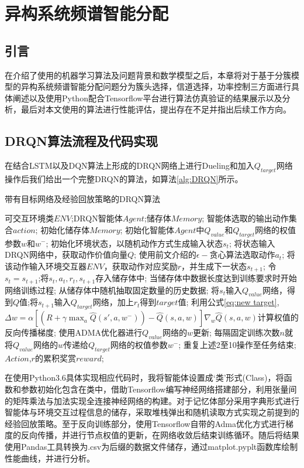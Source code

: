 \chapter{异构系统频谱智能分配}
\section{引言}
在介绍了使用的机器学习算法及问题背景和数学模型之后，本章将对于基于分簇模型的异构系统频谱智能分配问题分为簇头选择，信道选择，功率控制三方面进行具体阐述以及使用Python配合Tensorflow平台进行算法仿真验证的结果展示以及分析，最后对本文使用的算法进行性能评估，提出存在不足并指出后续工作方向。

\section{DRQN算法流程及代码实现}
在结合LSTM以及DQN算法上形成的DRQN网络上进行Dueling和加入$Q_{target}$网络操作后我们给出一个完整DRQN的算法，如算法\ref{alg:DRQN}所示。
\begin{algorithm}[htb]  
	\caption{带有目标网络及经验回放策略的DRQN算法 }  
	\label{alg:DRQN}  
	 \begin{algorithmic}[1]  
		\Require  
		可交互环境类$ENV$;DRQN智能体$Agent$;储存体$Memory$;  
		\Ensure  
		智能体选取的输出动作集合$action$;  
		\State 初始化储存体$Memory$; 初始化智能体$Agent$中$Q_{value}$和$Q_{target}$网络的权值参数$w$和$w^{-}$;
		初始化环境状态，以随机动作方式生成输入状态$s_{t}$; 
		\State 将状态输入DRQN网络中，获取动作价值向量$Q$;  
		\State 使用前文介绍的$\epsilon -$贪心算法选取动作$a_{t}$; 
		\State 将该动作输入环境交互器$ENV$，获取动作对应奖励$r$，并生成下一状态$s_{t+1}$;
		\State 令$s_{t}=s_{t+1}$;将$s_{t},a_{t},r_{t},s_{t+1}$存入储存体中; 
		\State 当储存体中数据长度达到训练要求时开始网络训练过程; 从储存体中随机抽取固定数量的历史数据;  
		\State 将$s_{t}$输入$Q_{value}$网络，得到$Q$值;将$s_{t+1}$输入$Q_{target}$网络，加上$r_{t}$得到$target$值;
		\State 利用公式\ref{eq:new target},$\Delta w=\alpha\left [ \left ( R+\gamma\max _{a} \hat{Q}\left ( {s}' ,a,w^{-}\right )\right )- 	\hat{Q}\left ( s ,a,w\right )\right ]\nabla_{w}\hat{Q}\left ( s,a,w \right )$计算权值的反向传播梯度;
		\State 使用ADMA优化器进行$Q_{value}$网络的$w$更新;
		\State 每隔固定训练次数$n$就将$Q_{value}$网络的$w$传递给$Q_{target}$网络的权值参数$w^{-}$;
		\State 重复上述2至10操作至任务结束; \\
		\Return $Action$,$r$的累积奖赏$reward$;  
	\end{algorithmic}  
\end{algorithm}  
在使用Python3.6具体实现相应代码时，我将智能体设置成‘类’形式(Class)，将函数和参数初始化包含在类中，借助Tensorflow编写神经网络搭建部分，利用张量间的矩阵乘法与加法实现全连接神经网络的构建。对于记忆体部分采用字典形式进行智能体与环境交互过程信息的储存，采取堆栈弹出和随机读取方式实现之前提到的经验回放策略。至于反向训练部分，使用Tensorflow自带的Adma优化方式进行梯度的反向传播，并进行节点权值的更新，在网络收敛后结束训练循环。随后将结果使用Pandas工具转换为.csv为后缀的数据文件储存，通过matplot.pyplt函数库绘制性能曲线，并进行分析。

